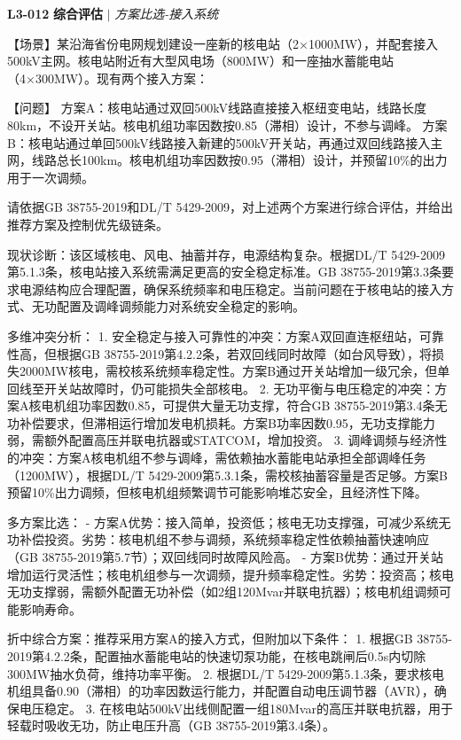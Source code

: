\documentclass[11pt,a4paper]{ctexart}
\begin{document}
\noindent\textbf{L3-012} \hfill \textbf{综合评估} $|$ \textit{方案比选-接入系统}
\begin{description}[leftmargin=1.5em,style=nextline,font=\normalfont]
  \item[Q:] 【场景】某沿海省份电网规划建设一座新的核电站（2×1000MW），并配套接入500kV主网。核电站附近有大型风电场（800MW）和一座抽水蓄能电站（4×300MW）。现有两个接入方案：

【问题】
方案A：核电站通过双回500kV线路直接接入枢纽变电站，线路长度80km，不设开关站。核电机组功率因数按0.85（滞相）设计，不参与调峰。
方案B：核电站通过单回500kV线路接入新建的500kV开关站，再通过双回线路接入主网，线路总长100km。核电机组功率因数按0.95（滞相）设计，并预留10\%的出力用于一次调频。

请依据GB 38755-2019和DL/T 5429-2009，对上述两个方案进行综合评估，并给出推荐方案及控制优先级链条。
  \item[A:] 现状诊断：该区域核电、风电、抽蓄并存，电源结构复杂。根据DL/T 5429-2009第5.1.3条，核电站接入系统需满足更高的安全稳定标准。GB 38755-2019第3.3条要求电源结构应合理配置，确保系统频率和电压稳定。当前问题在于核电站的接入方式、无功配置及调峰调频能力对系统安全稳定的影响。

多维冲突分析：
1. 安全稳定与接入可靠性的冲突：方案A双回直连枢纽站，可靠性高，但根据GB 38755-2019第4.2.2条，若双回线同时故障（如台风导致），将损失2000MW核电，需校核系统频率稳定性。方案B通过开关站增加一级冗余，但单回线至开关站故障时，仍可能损失全部核电。
2. 无功平衡与电压稳定的冲突：方案A核电机组功率因数0.85，可提供大量无功支撑，符合GB 38755-2019第3.4条无功补偿要求，但滞相运行增加发电机损耗。方案B功率因数0.95，无功支撑能力弱，需额外配置高压并联电抗器或STATCOM，增加投资。
3. 调峰调频与经济性的冲突：方案A核电机组不参与调峰，需依赖抽水蓄能电站承担全部调峰任务（1200MW），根据DL/T 5429-2009第5.3.1条，需校核抽蓄容量是否足够。方案B预留10\%出力调频，但核电机组频繁调节可能影响堆芯安全，且经济性下降。

多方案比选：
- 方案A优势：接入简单，投资低；核电无功支撑强，可减少系统无功补偿投资。劣势：核电机组不参与调频，系统频率稳定性依赖抽蓄快速响应（GB 38755-2019第5.7节）；双回线同时故障风险高。
- 方案B优势：通过开关站增加运行灵活性；核电机组参与一次调频，提升频率稳定性。劣势：投资高；核电无功支撑弱，需额外配置无功补偿（如2组120Mvar并联电抗器）；核电机组调频可能影响寿命。

折中综合方案：推荐采用方案A的接入方式，但附加以下条件：
1. 根据GB 38755-2019第4.2.2条，配置抽水蓄能电站的快速切泵功能，在核电跳闸后0.5s内切除300MW抽水负荷，维持功率平衡。
2. 根据DL/T 5429-2009第5.1.3条，要求核电机组具备0.90（滞相）的功率因数运行能力，并配置自动电压调节器（AVR），确保电压稳定。
3. 在核电站500kV出线侧配置一组180Mvar的高压并联电抗器，用于轻载时吸收无功，防止电压升高（GB 38755-2019第3.4条）。


\end{description}
\end{document}
